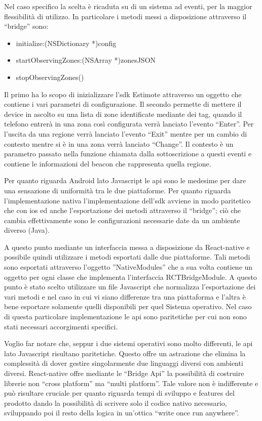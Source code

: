 Nel caso specifico la scelta è ricaduta su di un sistema ad eventi, per la maggior flessibilità di utilizzo. In particolare i metodi messi a disposizione attraverso il “bridge” sono:
\begin{itemize}
	\item initialize:(NSDictionary *)config
	\item startObservingZones:(NSArray *)zonesJSON
	\item stopObservingZones()
\end{itemize}
	\vspace{5mm}
Il primo ha lo scopo di inizializzare l’sdk Estimote attraverso un oggetto che contiene i vari parametri di configurazione. Il secondo permette di mettere il device in ascolto su una lista di zone identificate mediante dei tag, quando il telefono entrerà in una zona così configurata verrà lanciato l’evento “Enter”. Per l’uscita da una regione verrà lanciato l’evento “Exit” mentre per un cambio di contesto mentre si è in una zona verrà lanciato “Change”. Il contesto è un parametro passato nella funzione chiamata dalla sottoscrizione a questi eventi e contiene le informazioni del beacon che rappresenta quella regione.\vspace{5mm}

Per quanto riguarda Android lato Javascript le api sono le medesime per dare una sensazione di uniformità tra le due piattaforme. Per quanto riguarda l’implementazione nativa l’implementazione dell’sdk avviene in modo paritetico che con ios ed anche l’esportazione dei metodi attraverso il “bridge”; ciò che cambia effettivamente sono le configurazioni necessarie date da un ambiente diverso (Java).\vspace{5mm}

A questo punto mediante un interfaccia messa a disposizione da React-native e possibile quindi utilizzare i metodi esportati dalle due piattaforme. Tali metodi sono esportati attraverso l’oggetto ”NativeModules” che a sua volta contiene un oggetto per ogni classe che implementa l’interfaccia RCTBridgeModule. A questo punto è stato scelto utilizzare un file Javascript che normalizza l’esportazione dei vari metodi e nel caso in cui vi siano differenze tra una piattaforma e l’altra è bene esportare solamente quelli disponibili per quel Sistema operativo. Nel caso di questa particolare implementazione le api sono paritetiche per cui non sono stati necessari accorgimenti specifici.\vspace{5mm}

Voglio far notare che, seppur i due sistemi operativi sono molto differenti, le api lato Javascript risultano paritetiche. Questo offre un astrazione che elimina la complessità di dover gestire singolarmente due linguaggi diversi con ambienti diversi. React-native offre mediante le “Bridge Api” la possibilità di costruire librerie non “cross platform” ma “multi platform”. Tale valore non è indifferente e può risultare cruciale per quanto riguarda tempi di sviluppo e features del prodotto dando la possibilità di scrivere solo il codice nativo necessario, sviluppando poi il resto della logica in un'ottica “write once run anywhere”.\vspace{5mm}

